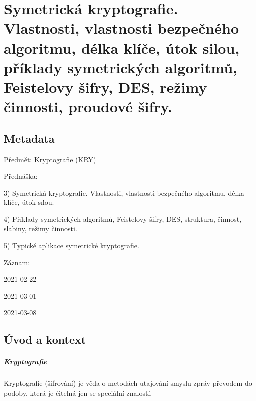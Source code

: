 

\chapter{Symetrická kryptografie. Vlastnosti, vlastnosti bezpečného algoritmu, délka klíče, útok silou,
příklady symetrických algoritmů, Feistelovy šifry, DES, režimy činnosti, proudové šifry.}


\section{Metadata}

\begin{compactitem}
    \item Předmět: Kryptografie (KRY)
    \item Přednáška:
    \begin{compactitem}
        \item 3) Symetrická kryptografie. Vlastnosti, vlastnosti bezpečného algoritmu, délka klíče, útok silou.
        \item 4) Příklady symetrických algoritmů, Feistelovy šifry, DES, struktura, činnost, slabiny, režimy činnosti.
        \item 5) Typické aplikace symetrické kryptografie.
    \end{compactitem}
    \item Záznam:
    \begin{compactitem}
        \item 2021-02-22
        \item 2021-03-01
        \item 2021-03-08
    \end{compactitem}
\end{compactitem}


\section{Úvod a kontext}

\paragraph*{Kryptografie} Kryptografie (šifrování) je věda o metodách utajování smyslu zpráv převodem do podoby, která je čitelná jen se speciální znalostí.

